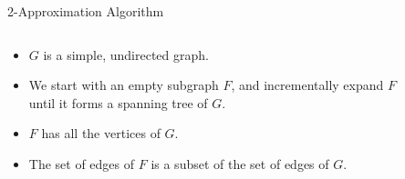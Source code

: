 \documentclass{beamer}
\begin{document}
\begin{frame}{2-Approximation Algorithm}
\bigskip
\begin{columns}
    \begin{column}{0.6\textwidth}
        \begin{itemize}[<+->]
            \item $G$ is a simple, undirected graph.
            \item We start with an empty subgraph $F$, and incrementally expand $F$ until it forms a spanning tree of $G$.
            \item $F$ has all the vertices of $G$.
            \item The set of edges of $F$ is a subset of the set of edges of $G$.
        \end{itemize}
    \end{column}
    \begin{column}{0.4\textwidth}
        \begin{figure}
        \end{figure}
    \end{column}
\end{columns}
\end{frame}
\end{document}
